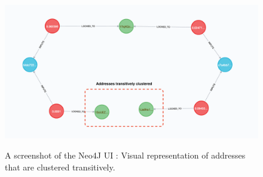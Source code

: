 \begin{figure}[h!]
  \centering
  \includegraphics[width = 15cm]{./figures/neo4j-screenshots/addresses-transitively-clustered}\\[0.5cm] 
  \caption{A screenshot of the Neo4J UI : Visual representation of addresses that are clustered transitively.}
  \label{fig:neo4j-transitive-clustering-screenshot}
\end{figure}
